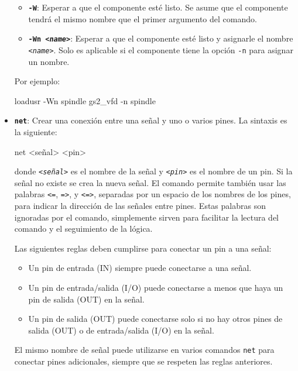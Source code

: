 \documentclass[english,spanish,a4paper,11pt]{article}
\begin{document}
\begin{itemize}
\begin{itemize}
        \item \textbf{\texttt{-W}}: Esperar a que el componente esté listo. Se asume que el componente tendrá el mismo nombre que el primer argumento del comando.

        \item \textbf{\texttt{-Wn \textit{<name>}}}: Esperar a que el componente esté listo y asignarle el nombre \textit{\texttt{<name>}}. Solo es aplicable si el componente tiene la opción \texttt{-n} para asignar un nombre.
    \end{itemize}
    Por ejemplo:
\begin{listingbox}
loadusr -Wn spindle gs2_vfd -n spindle
\end{listingbox}

    \item \textbf{\texttt{net}}: Crear una conexión entre una señal y uno o varios pines. La sintaxis es la siguiente:
\begin{listingbox}[][language=example,escapechar={\%}]
net <señal> <pin> %
\end{listingbox}
    donde \textit{\texttt{<señal>}} es el nombre de la señal y \textit{\texttt{<pin>}} es el nombre de un pin.  Si la señal no existe se crea la nueva señal. El comando permite también usar las palabras \texttt{<=}, \texttt{=>}, y \texttt{<=>}, separadas por un espacio de los nombres de los pines, para indicar la dirección de las señales entre pines. Estas palabras son ignoradas por el comando, simplemente sirven para facilitar la lectura del comando y el seguimiento de la lógica.

    Las siguientes reglas deben cumplirse para conectar un pin a una señal:
    \begin{itemize}
        \item Un pin de entrada (IN) siempre puede conectarse a una señal.

        \item Un pin de entrada/salida (I/O) puede conectarse a menos que haya un pin de salida (OUT) en la señal.

        \item Un pin de salida (OUT) puede conectarse solo si no hay otros pines de salida (OUT) o de entrada/salida (I/O) en la señal.
    \end{itemize}

    El mismo nombre de señal puede utilizarse en varios comandos \texttt{net} para conectar pines adicionales, siempre que se respeten las reglas anteriores.


\end{itemize}
\end{document}
